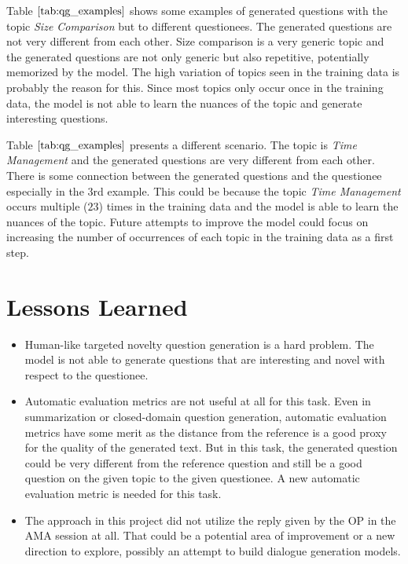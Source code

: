 \documentclass[paper=a4, fontsize=11pt]{scrartcl}
\numberwithin{equation}{section}		%
\numberwithin{figure}{section}			%
\numberwithin{table}{section}				%
\begin{document}
Table $\ref{tab:qg_examples}$ shows some examples of generated questions with the topic \textit{Size Comparison} but to different questionees.
The generated questions are not very different from each other.
Size comparison is a very generic topic and the generated questions are not only generic but also repetitive, potentially memorized by the model.
The high variation of topics seen in the training data is probably the reason for this.
Since most topics only occur once in the training data, the model is not able to learn the nuances of the topic and generate interesting questions.

Table $\ref{tab:qg_examples}$ presents a different scenario.
The topic is \textit{Time Management} and the generated questions are very different from each other.
There is some connection between the generated questions and the questionee especially in the 3rd example.
This could be because the topic \textit{Time Management} occurs multiple ($23$) times in the training data and the model is able to learn the nuances of the topic.
Future attempts to improve the model could focus on increasing the number of occurrences of each topic in the training data as a first step.


\section{Lessons Learned}

\begin{itemize}
  \item Human-like targeted novelty question generation is a hard problem. The model is not able to generate questions that are interesting and novel with respect to the questionee.
  \item Automatic evaluation metrics are not useful at all for this task. Even in summarization or closed-domain question generation, automatic evaluation metrics have some merit as the distance from the reference is a good proxy for the quality of the generated text. But in this task, the generated question could be very different from the reference question and still be a good question on the given topic to the given questionee. A new automatic evaluation metric is needed for this task.
  \item The approach in this project did not utilize the reply given by the OP in the AMA session at all. That could be a potential area of improvement or a new direction to explore, possibly an attempt to build dialogue generation models.
\end{itemize}






\end{document}
